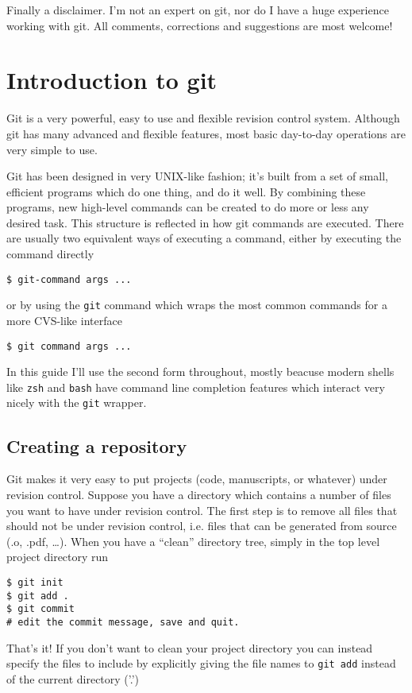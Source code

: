 \documentclass[a4paper,10pt]{article}
\begin{document}
Finally a disclaimer. I'm not an expert on git, nor do I have a huge
experience working with git. All comments, corrections and suggestions are 
most welcome!

\section{Introduction to git}
Git is a very powerful, easy to use and flexible revision control system.
Although git has many advanced and flexible features, most basic  day-to-day
operations are very simple to use. 

Git has been designed in very UNIX-like fashion; it's built from a set of
small, efficient programs which do one thing, and do it well. By combining
these programs, new high-level commands can be created to do more or less any
desired task. This structure is reflected in how git commands are executed.
There are usually two equivalent ways of executing a command, either by
executing the command directly
\begin{verbatim}
$ git-command args ...
\end{verbatim}
or by using the \texttt{git} command which wraps the most common commands for a
more CVS-like interface
\begin{verbatim}
$ git command args ...
\end{verbatim}
In this guide I'll use the second form throughout, mostly beacuse modern
shells like \texttt{zsh} and \texttt{bash} have command line
completion features which interact very nicely with the \texttt{git} wrapper.

\subsection{Creating a repository}
Git makes it very easy to put projects (code, manuscripts, or whatever) under
revision control. Suppose you have a directory which contains a number of
files you want to have under revision control. The first step is to remove all
files that should not be under revision control, i.e. files that can be
generated from source (.o, .pdf, \ldots). When you have a ``clean'' directory
tree, simply in the top level project directory run
\begin{verbatim}
$ git init
$ git add .
$ git commit
# edit the commit message, save and quit.
\end{verbatim}
That's it! 
If you don't want to clean your project directory
you can instead specify the files to include by explicitly giving the file
names to \texttt{git add} instead of the current directory ('.')
\end{document}
